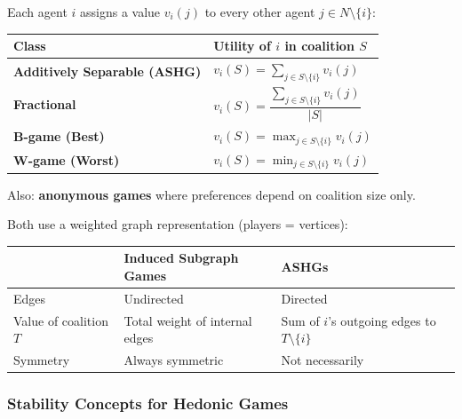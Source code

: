 \begin{defbox}
Each agent $i$ assigns a value $v_i(j)$ to every other agent $j \in N \setminus \{i\}$:

\begin{center}
\renewcommand{\arraystretch}{1.4}
\begin{tabular}{@{} l p{8cm} @{}}
\toprule
\textbf{Class} & \textbf{Utility of $i$ in coalition $S$} \\
\midrule
\textbf{Additively Separable (ASHG)} & $v_i(S) = \displaystyle\sum_{j \in S \setminus \{i\}} v_i(j)$ \\[6pt]
\textbf{Fractional} & $v_i(S) = \dfrac{\sum_{j \in S \setminus \{i\}} v_i(j)}{|S|}$ \\[6pt]
\textbf{B-game (Best)} & $v_i(S) = \displaystyle\max_{j \in S \setminus \{i\}} v_i(j)$ \\[6pt]
\textbf{W-game (Worst)} & $v_i(S) = \displaystyle\min_{j \in S \setminus \{i\}} v_i(j)$ \\
\bottomrule
\end{tabular}
\end{center}

Also: \textbf{anonymous games} where preferences depend on coalition size only.
\end{defbox}

\begin{defbox}
Both use a weighted graph representation (players = vertices):
\begin{center}
\renewcommand{\arraystretch}{1.3}
\begin{tabular}{@{} l p{5cm} p{5cm} @{}}
\toprule
 & \textbf{Induced Subgraph Games} & \textbf{ASHGs} \\
\midrule
Edges & Undirected & Directed \\
Value of coalition $T$ & Total weight of internal edges & Sum of $i$'s outgoing edges to $T \setminus \{i\}$ \\
Symmetry & Always symmetric & Not necessarily \\
\bottomrule
\end{tabular}
\end{center}
\end{defbox}

\bigseparator

\subsubsection{Stability Concepts for Hedonic Games}

